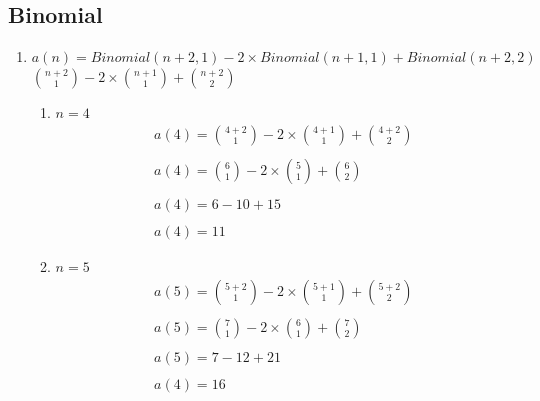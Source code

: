 \documentclass[a4paper,10pt]{article}
\begin{document}
\subsection{Binomial}
\begin{enumerate}
 \item $a(n) = Binomial(n+2,1)-2\times Binomial(n+1,1)+Binomial(n+2,2)$\\

  \hspace{1cm}${n+2 \choose 1} - 2\times {n+1 \choose 1} + {n+2 \choose 2}$\\
  \begin{enumerate}
    \item $n = 4$
    \[
     \boxed{ 
	  \begin{gathered}
       	a(4) = {4+2 \choose 1} - 2\times {4+1 \choose 1} + {4+2 \choose 2}\\
		\\ 
       	a(4) = {6 \choose 1} - 2\times {5 \choose 1} + {6 \choose 2} \\
       	\\
       	a(4) = 6 - 10 + 15\\
       	\\
       	a(4) = 11 
      \end{gathered}	    
	  }
    \]	  
    \item $ n = 5$
    \[
     \boxed{ 
	  \begin{gathered}
       	a(5) = {5+2 \choose 1} - 2\times {5+1 \choose 1} + {5+2 \choose 2}\\
		\\ 
       	a(5) = {7 \choose 1} - 2\times {6 \choose 1} + {7 \choose 2} \\
       	\\
       	a(5) = 7 - 12 + 21\\
       	\\
       	a(4) = 16 
      \end{gathered}	    
	  }
    \]	
  \end{enumerate}
\end{enumerate}
\end{document}

